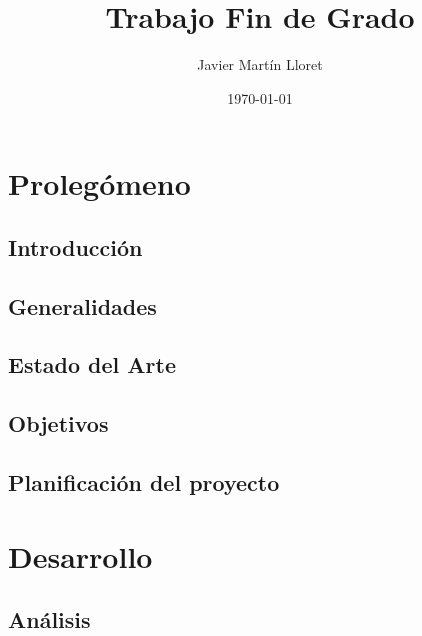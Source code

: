 \documentclass[11pt,a4paper]{book}
\author{Javier Martín Lloret}
\title{Trabajo Fin de Grado}
\date{\today}
\begin{document}
\pagestyle{plain}


\cleardoublepage


\cleardoublepage





\newpage



\newpage

\frontmatter

\tableofcontents
\listoffigures
\listoftables
\newpage

\part{Prolegómeno}

\chapter{Introducción}

\chapter{Generalidades}

\chapter{Estado del Arte}

\chapter{Objetivos}

\chapter{Planificación del proyecto}


\part{Desarrollo}

\chapter{Análisis}
\end{document}
